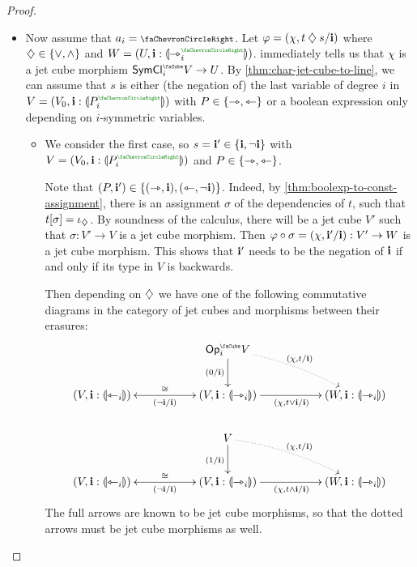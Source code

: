 \documentclass[a4paper]{memoir}
\begin{document}
\begin{proof}
\begin{itemize}
\begin{itemize}
\begin{itemize}
				\item If $t$ depends on $\dm k$, then $\chi$ and $s$ do not so $p(\vec v) = p(\vec v')$ and we are done.
			\end{itemize}
			
			\item Now assume that $a_i = \ypolar$.
			Let $\varphi = (\chi, t \mathbin{\diamondsuit} s/\mathbf{i})$ where $\mathbin{\diamondsuit} \in \mathopen{}\left\{ {\vee}, {\wedge} \right\}\mathclose{}$ and $W = (U, \dm i : \rival{\jet_i\pmr{\ypolar}})$.
			 immediately tells us that $\chi$ is a jet cube morphism $\UFsymcube_i V \to U$.
			By \cref{thm:char-jet-cube-to-line}, we can assume that $s$ is either (the negation of) the last variable of degree $i$ in $V = (V_0, \dm i : \rival{P_i\pmr{\ypolar}})$ with $P \in \mathopen{}\left\{ \rightarrowtriangle, \leftarrowtriangle \right\}\mathclose{}$ or a boolean expression only depending on $i$-symmetric variables.
			\begin{itemize}
				\item We consider the first case, so $s = \mathbf{i}' \in \mathopen{}\left\{ \mathbf{i}, \lnot \mathbf{i} \right\}\mathclose{}$ with $V = (V_0, \dm i : \rival{P_i\pmr{\ypolar}})$ and $P \in \mathopen{}\left\{ \rightarrowtriangle, \leftarrowtriangle \right\}\mathclose{}$.
				
				Note that $(P, \mathbf{i}') \in \mathopen{}\left\{ (\rightarrowtriangle, \mathbf{i}), (\leftarrowtriangle, \lnot \mathbf{i}) \right\}\mathclose{}$.
				Indeed, by \cref{thm:boolexp-to-const-assignment}, there is an assignment $\sigma$ of the dependencies of $t$, such that $t[\sigma] = \iota_{\mathbin{\diamondsuit}}$.
				By soundness of the calculus, there will be a jet cube $V'$ such that $\sigma : V' \to V$ is a jet cube morphism.
				Then $\varphi \circ \sigma = (\chi, \mathbf{i}' / \mathbf{i}) : V' \to W$ is a jet cube morphism.
				This shows that $\mathbf{i}'$ needs to be the negation of $\mathbf{i}$ if and only if its type in $V$ is backwards.
				
				Then depending on $\mathbin{\diamondsuit}$ we have one of the following commutative diagrams in the category of jet cubes and morphisms between their erasures:
				\[
					\xymatrix{
						&&\Opcube_i V
							\ar[d]_{(0/\dm i)}
							\ar@{.>}@/^/[rrd]^{(\chi, t/\dm i)}
						\\
						(V, \dm i : \rival{\tej_i})
							\ar@{<->}[rr]^{\cong}_{(\lnot \dm i/\dm i)}
						&&
						(V, \dm i : \rival{\jet_i})
							\ar[rr]_{(\chi, t \vee \dm i/\dm i)}
						&&
						(W, \dm i : \rival{\jet_i})
						\\
						&& V
							\ar[d]_{(1/\dm i)}
							\ar@{.>}@/^/[rrd]^{(\chi, t/\dm i)}
						\\
						(V, \dm i : \rival{\tej_i})
							\ar@{<->}[rr]^{\cong}_{(\lnot \dm i/\dm i)}
						&&
						(V, \dm i : \rival{\jet_i})
							\ar[rr]_{(\chi, t \wedge \dm i/\dm i)}
						&&
						(W, \dm i : \rival{\jet_i})
					}
				\]
				The full arrows are known to be jet cube morphisms, so that the dotted arrows must be jet cube morphisms as well.
				

\end{itemize}
\end{itemize}
\end{itemize}
\end{proof}
\end{document}
